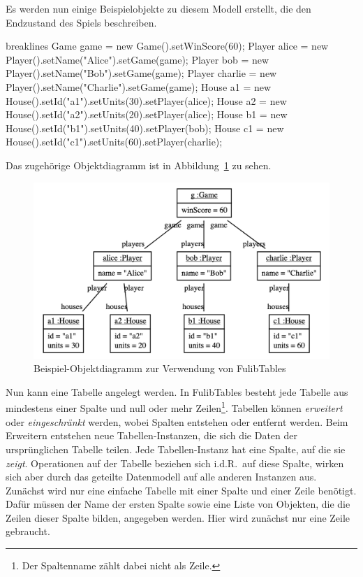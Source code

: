 Es werden nun einige Beispielobjekte zu diesem Modell erstellt, die den Endzustand des Spiels beschreiben.

\begin{jcodeblock*}{breaklines}
    Game game = new Game().setWinScore(60);
    Player alice = new Player().setName("Alice").setGame(game);
    Player bob = new Player().setName("Bob").setGame(game);
    Player charlie = new Player().setName("Charlie").setGame(game);
    House a1 = new House().setId("a1").setUnits(30).setPlayer(alice);
    House a2 = new House().setId("a2").setUnits(20).setPlayer(alice);
    House b1 = new House().setId("b1").setUnits(40).setPlayer(bob);
    House c1 = new House().setId("c1").setUnits(60).setPlayer(charlie);
\end{jcodeblock*}

Das zugehörige Objektdiagramm ist in Abbildung~\ref{fig:game-object-diagram} zu sehen.

\begin{figure}
    \includegraphics[width=\textwidth]{chapter/pattern-matching/img/game-object-diagram.png}
    \caption{Beispiel-Objektdiagramm zur Verwendung von FulibTables}
    \label{fig:game-object-diagram}
\end{figure}

Nun kann eine Tabelle angelegt werden.
In FulibTables besteht jede Tabelle aus mindestens einer Spalte und null oder mehr Zeilen\footnote{Der Spaltenname zählt dabei nicht als Zeile.}.
Tabellen können \emph{erweitert} oder \emph{eingeschränkt} werden, wobei Spalten entstehen oder entfernt werden.
Beim Erweitern entstehen neue Tabellen-Instanzen,
die sich die Daten der ursprünglichen Tabelle teilen.
Jede Tabellen-Instanz hat eine Spalte, auf die sie \emph{zeigt}.
Operationen auf der Tabelle beziehen sich i.d.R.\ auf diese Spalte,
wirken sich aber durch das geteilte Datenmodell auf alle anderen Instanzen aus.
Zunächst wird nur eine einfache Tabelle mit einer Spalte und einer Zeile benötigt.
Dafür müssen der Name der ersten Spalte sowie eine Liste von Objekten, die die Zeilen dieser Spalte bilden, angegeben werden.
Hier wird zunächst nur eine Zeile gebraucht.

